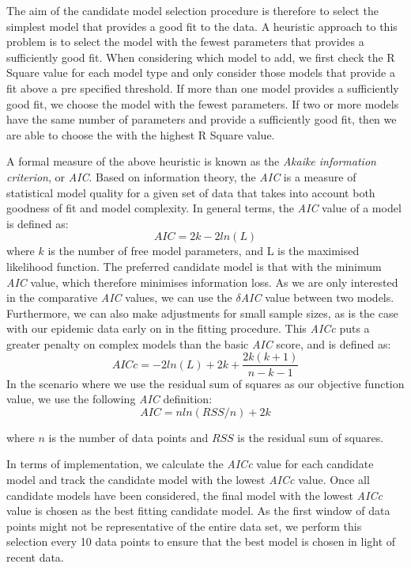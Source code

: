 The aim of the candidate model selection procedure is therefore to
select the simplest model that provides a good fit to the data. A
heuristic approach to this problem is to select the model with the
fewest parameters that provides a sufficiently good fit. When
considering which model to add, we first check the R Square value for
each model type and only consider those models that provide a fit
above a pre specified threshold. If more than one model provides a
sufficiently good fit, we choose the model with the fewest
parameters. If two or more models have the same number of parameters
and provide a sufficiently good fit, then we are able to choose the
with the highest R Square value. 

A formal measure of the above heuristic is known as the \emph{Akaike
  information criterion}, or \emph{AIC}.\cite{burnham} Based on information theory, the \emph{AIC} is a measure
of statistical model quality for a given set of data that takes into
account both goodness of fit and model complexity. In general terms, the \emph{AIC}
value of a model is defined as:
\begin{equation}
AIC = 2k - 2ln(L)
\end{equation}
where $k$ is the number of free model parameters, and L is the maximised
likelihood function. The preferred candidate model is that with the
minimum \emph{AIC} value, which therefore minimises information loss. As we are only interested in the comparative
\emph{AIC} values, we can use the $\delta$\emph{AIC} value between two
models. Furthermore, we can also make adjustments for small sample
sizes, as is the case with our epidemic data early on in the fitting
procedure. This \emph{AICc} puts a greater penalty on complex models
than the basic \emph{AIC} score, and is defined as:
\begin{equation}
AICc = -2ln(L) + 2k + \frac{2k(k+1)}{n - k - 1}
\end{equation}
In the scenario where we use the residual sum of squares as our
objective function value, we use the following \emph{AIC} definition:
\begin{equation}
AIC = nln(RSS/n) + 2k
\end{equation}

where $n$ is the number of data points and $RSS$ is the residual sum
of squares.

In terms of implementation, we calculate the \emph{AICc} value for
each candidate model and track the candidate model with the lowest
\emph{AICc} value. Once all candidate models have been considered, the
final model with the lowest \emph{AICc} value is chosen as the best
fitting candidate model. As the first window of data points might not
be representative of the entire data set, we perform this selection
every 10 data points to ensure that the best model is chosen in light
of recent data. 

